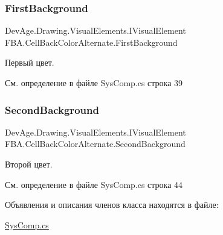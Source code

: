 \subsubsection{\texorpdfstring{First\+Background}{FirstBackground}}
{\footnotesize\ttfamily Dev\+Age.\+Drawing.\+Visual\+Elements.\+I\+Visual\+Element F\+B\+A.\+Cell\+Back\+Color\+Alternate.\+First\+Background}



Первый цвет. 



См. определение в файле Sys\+Comp.\+cs строка 39

\mbox{\label{class_f_b_a_1_1_cell_back_color_alternate_a4b151754e326967c87b3a3bafe26df41}} 
\subsubsection{\texorpdfstring{Second\+Background}{SecondBackground}}
{\footnotesize\ttfamily Dev\+Age.\+Drawing.\+Visual\+Elements.\+I\+Visual\+Element F\+B\+A.\+Cell\+Back\+Color\+Alternate.\+Second\+Background}



Второй цвет. 



См. определение в файле Sys\+Comp.\+cs строка 44



Объявления и описания членов класса находятся в файле\+:\begin{DoxyCompactItemize}
\item 
\mbox{\hyperlink{_sys_comp_8cs}{Sys\+Comp.\+cs}}\end{DoxyCompactItemize}
